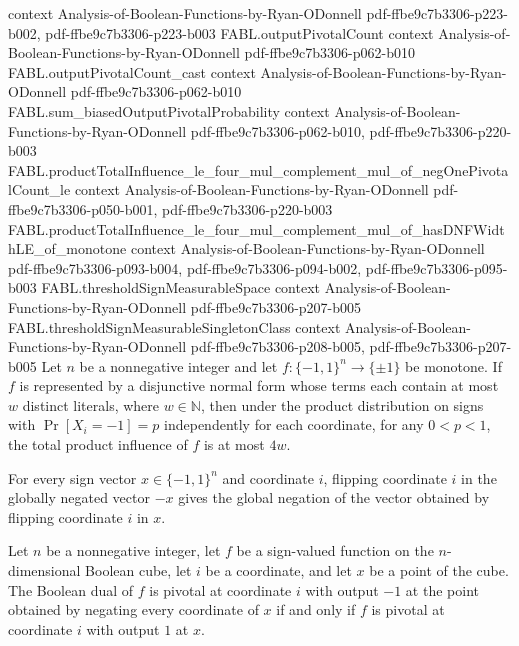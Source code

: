 \begin{theorem}
  {context}
  {Analysis-of-Boolean-Functions-by-Ryan-ODonnell}
  {pdf-ffbe9c7b3306-p223-b002,
    pdf-ffbe9c7b3306-p223-b003}
\proofstep
  {FABL.outputPivotalCount}
  {context}
  {Analysis-of-Boolean-Functions-by-Ryan-ODonnell}
  {pdf-ffbe9c7b3306-p062-b010}
\proofstep
  {FABL.outputPivotalCount_cast}
  {context}
  {Analysis-of-Boolean-Functions-by-Ryan-ODonnell}
  {pdf-ffbe9c7b3306-p062-b010}
\proofstep
  {FABL.sum_biasedOutputPivotalProbability}
  {context}
  {Analysis-of-Boolean-Functions-by-Ryan-ODonnell}
  {pdf-ffbe9c7b3306-p062-b010,
    pdf-ffbe9c7b3306-p220-b003}
\proofstep
  {FABL.productTotalInfluence_le_four_mul_complement_mul_of_negOnePivotalCount_le}
  {context}
  {Analysis-of-Boolean-Functions-by-Ryan-ODonnell}
  {pdf-ffbe9c7b3306-p050-b001,
    pdf-ffbe9c7b3306-p220-b003}
\proofstep
  {FABL.productTotalInfluence_le_four_mul_complement_mul_of_hasDNFWidthLE_of_monotone}
  {context}
  {Analysis-of-Boolean-Functions-by-Ryan-ODonnell}
  {pdf-ffbe9c7b3306-p093-b004,
    pdf-ffbe9c7b3306-p094-b002,
    pdf-ffbe9c7b3306-p095-b003}
\proofstep
  {FABL.thresholdSignMeasurableSpace}
  {context}
  {Analysis-of-Boolean-Functions-by-Ryan-ODonnell}
  {pdf-ffbe9c7b3306-p207-b005}
\proofstep
  {FABL.thresholdSignMeasurableSingletonClass}
  {context}
  {Analysis-of-Boolean-Functions-by-Ryan-ODonnell}
  {pdf-ffbe9c7b3306-p208-b005,
    pdf-ffbe9c7b3306-p207-b005}
Let $n$ be a nonnegative integer and let $f:\{-1,1\}^n\to\{\pm1\}$ be monotone. If $f$
is represented by a disjunctive normal form whose terms each contain at most $w$
distinct literals, where $w\in\mathbb N$, then under the product distribution on signs
with $\Pr[X_i=-1]=p$ independently for each coordinate, for any $0<p<1$, the total
product influence of $f$ is at most $4w$.
\end{theorem}

\begin{theorem}
\label{FABL.flipCoordinate_negateSignCube}
\leanok
{}
For every sign vector $x\in\{−1,1\}^n$ and coordinate $i$, flipping coordinate $i$ in
the globally negated vector $-x$ gives the global negation of the vector obtained by
flipping coordinate $i$ in $x$.
\end{theorem}

\begin{theorem}
\label{FABL.isNegOnePivotal_booleanDual_negate_iff}
\leanok
{}
Let $n$ be a nonnegative integer, let $f$ be a sign-valued function on the
$n$-dimensional Boolean cube, let $i$ be a coordinate, and let $x$ be a point of the
cube. The Boolean dual of $f$ is pivotal at coordinate $i$ with output $-1$ at the point
obtained by negating every coordinate of $x$ if and only if $f$ is pivotal at coordinate
$i$ with output $1$ at $x$.
\end{theorem}

